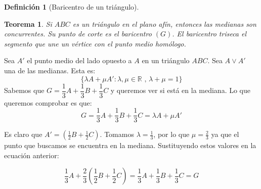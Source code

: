 \documentclass[11pt, a4paper]{article}
\makeatletter
\newif\IfInSansMode
\let\oldsf\sffamily
\renewcommand*{\sffamily}{\oldsf\mathversion{sans}\InSansModetrue}
\let\oldnorm\normalfont
\renewcommand*{\normalfont}{\oldnorm\InSansModefalse\mathversion{normal}}
\renewenvironment{proof}[1][\proofname] {\vspace{-15pt}\par\pushQED{\qed}\normalfont\topsep6\p@\@plus6\p@\relax\trivlist\item[\hskip\labelsep\it#1\@addpunct{.}]\ignorespaces}{\popQED\endtrivlist\@endpefalse}
\newcommand{\R}{\mathbb{R}}
\renewcommand{\vec}{\overrightarrow}
\renewenvironment{proof}[1][\proofname] {\par\pushQED{\qed}\normalfont\topsep6\p@\@plus6\p@\relax\trivlist\item[\hskip\labelsep\itshape\sffamily#1\@addpunct{.}]\ignorespaces}{\popQED\endtrivlist\@endpefalse}
\theoremstyle{theorem-style}
\newtheorem{nth}{Teorema}[section]
\theoremstyle{definition-style}
\newtheorem{ndef}{Definición}[section]
\theoremstyle{remark-style}
\theoremstyle{example-style}
\makeatother
\begin{document}
\begin{ndef}[Baricentro de un triángulo]
\begin{minipage}[]{0.27\textwidth}
\begin{center}
\end{center}

  \end{minipage}
\end{ndef}

\begin{nth}
  Si $ABC$ es un triángulo en el plano afín, entonces las medianas son concurrentes. Su punto de corte es el baricentro $(G)$. El baricentro triseca el segmento que une un vértice con el punto medio homólogo.


\end{nth}



\begin{proof}
  Sea $A'$ el punto medio del lado opuesto a $A$ en un triángulo $ABC$. Sea $A \vee A'$ una de las medianas. Esta es:
  \[
    \{\lambda A + \mu A': \lambda, \mu \in \R \text{ , } \lambda+\mu = 1\}
  \]
  Sabemos que $G = \dfrac{1}{3} A +  \dfrac{1}{3} B +  \dfrac{1}{3} C$ y queremos ver si está en la mediana. Lo que queremos comprobar es que:
  \[
    G = \dfrac{1}{3} A +  \dfrac{1}{3} B +  \dfrac{1}{3} C = \lambda A + \mu A'  
  \]
  
  Es claro que $A' = \left(\frac{1}{2}B + \frac{1}{2}C\right)$. Tomamos $\lambda = \frac{1}{3}$, por lo que $\mu = \frac{2}{3}$ ya que el punto que buscamos se encuentra en la mediana. Sustituyendo estos valores en la ecuación anterior:
  
  $$\dfrac{1}{3}A + \dfrac{2}{3}\left(\dfrac{1}{2}B+\dfrac{1}{2}C\right) = \frac{1}{3}A + \frac{1}{3}B + \frac{1}{3}C = G$$
\end{proof}
\end{document}
